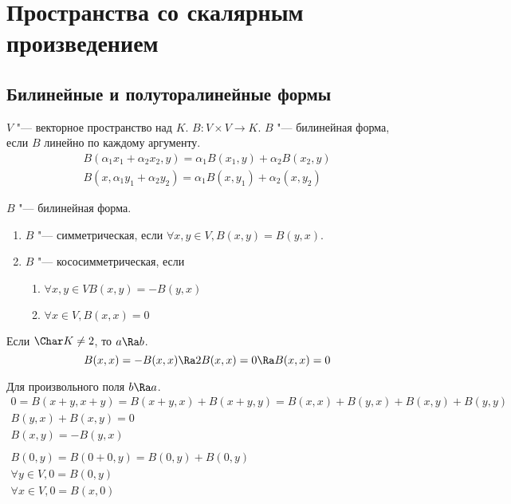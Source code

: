 \chapter{Пространства со скалярным произведением}
\section{Билинейные и полуторалинейные формы}

\begin{Def}
	$V$ "--- векторное пространство над $K$.
	$B \colon V \times V \to K$.
	$B$ "--- билинейная форма, если $B$ линейно по каждому аргументу.
	\begin{gather*}
		B(\alpha_1 x_1 + \alpha_2 x_2, y) = \alpha_1 B(x_1, y) + \alpha_2 B(x_2, y) \\
		B(x, \alpha_1y_1 + \alpha_2 y_2) = \alpha_1 B(x, y_1) + \alpha_2(x, y_2)
	\end{gather*}
\end{Def}

\begin{Def}
	$B$ "--- билинейная форма.
	\begin{enumerate}
	\item
		$B$ "--- симметрическая, если $\forall x, y \in V, B(x, y) = B(y, x)$.

	\item
		$B$ "--- кососимметрическая, если
		\begin{enumerate}
			\item $\forall x, y \in V B(x, y) = -B(y, x)$
			\item $\forall x \in V, B(x, x) = 0$
		\end{enumerate}
	\end{enumerate}
\end{Def}

\begin{Rem}
	Если $\Char K \ne 2$, то  $a \Ra b$.
	\[ B(x, x) = -B(x, x) \Ra 2B(x, x) = 0 \Ra B(x, x) = 0 \]
\end{Rem}
\begin{Rem}
	Для произвольного поля $b \Ra a$.
	\begin{gather*}
		0 = B(x + y, x + y) = B(x + y, x) + B(x + y, y) = B(x, x) + B(y, x) + B(x, y) + B(y, y) \\
		B(y, x) + B(x, y) = 0 \\
		B(x, y) = -B(y, x) \\
		\\
		B(0, y) = B(0 + 0, y) = B(0, y) + B(0, y) \\
		\forall y \in V, 0 = B(0, y) \\
		\forall x \in V, 0 = B(x, 0)
	\end{gather*}
\end{Rem}

